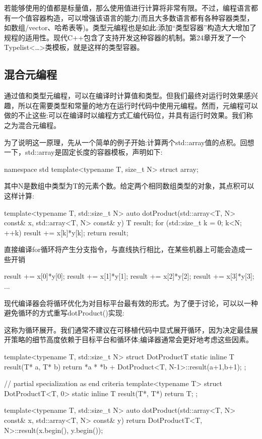 若能够使用的值都是标量值，那么使用值进行计算将非常有限。不过，编程语言都有一个值容器构造，可以增强该语言的能力(而且大多数语言都有各种容器类型，如数组/vector、哈希表等)。类型元编程也是如此:添加“类型容器”构造大大增加了规程的适用性。现代C++包含了支持开发这种容器的机制。第24章开发了一个Typelist<…>类模板，就是这样的类型容器。

\subsection{混合元编程}

通过值和类型元编程，可以在编译时计算值和类型。但我们最终对运行时效果感兴趣，所以在需要类型和常量的地方在运行时代码中使用元编程。然而，元编程可以做的不止这些:可以在编译时以编程方式汇编代码位，并具有运行时效果。我们称之为混合元编程。

为了说明这一原理，先从一个简单的例子开始:计算两个std::array值的点积。回想一下，std::array是固定长度的容器模板，声明如下:

\begin{cpp}
namespace std {
	template<typename T, size_t N> struct array;
}
\end{cpp}

其中N是数组中类型为T的元素个数。给定两个相同数组类型的对象，其点积可以这样计算:

\begin{cpp}
template<typename T, std::size_t N>
auto dotProduct(std::array<T, N> const& x, std::array<T, N> const& y)
{
	T result{};
	for (std::size_t k = 0; k<N; ++k) {
		result += x[k]*y[k];
	}
	return result;
}
\end{cpp}

直接编译for循环将产生分支指令，与直线执行相比，在某些机器上可能会造成一些开销

\begin{cpp}
result += x[0]*y[0];
result += x[1]*y[1];
result += x[2]*y[2];
result += x[3]*y[3];
...
\end{cpp}

现代编译器会将循环优化为对目标平台最有效的形式。为了便于讨论，可以以一种避免循环的方式重写dotProduct()实现:

\begin{notice}
这称为循环展开。我们通常不建议在可移植代码中显式展开循环，因为决定最佳展开策略的细节高度依赖于目标平台和循环体;编译器通常会更好地考虑这些因素。
\end{notice}

\begin{cpp}
template<typename T, std::size_t N>
struct DotProductT {
	static inline T result(T* a, T* b) {
		return *a * *b + DotProduct<T, N-1>::result(a+1,b+1);
	}
};

// partial specialization as end criteria
template<typename T>
struct DotProductT<T, 0> {
	static inline T result(T*, T*) {
		return T{};
	}
};

template<typename T, std::size_t N>
auto dotProduct(std::array<T, N> const& x,
				std::array<T, N> const& y)
{
	return DotProductT<T, N>::result(x.begin(), y.begin());
}
\end{cpp}

